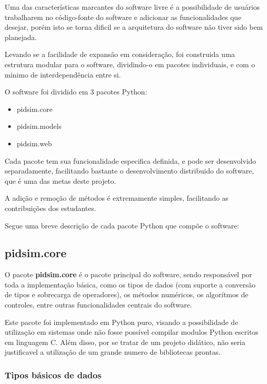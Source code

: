     Uma das características marcantes do software livre é a possibilidade de
    usuários trabalharem no código-fonte do software e adicionar as funcionalidades
    que desejar, porém isto se torna dificil se a arquitetura do software não tiver
    sido bem planejada.

    Levando se a facilidade de expansão em consideração, foi construida uma estrutura
    modular para o software, dividindo-o em pacotes individuais, e com o minimo de
    interdependência entre si.
    
    O software foi dividido em 3 pacotes Python:

    \begin{itemize}
        \item pidsim.core
        \item pidsim.models
        \item pidsim.web
    \end{itemize}

    Cada pacote tem sua funcionalidade especifica definida, e pode ser desenvolvido
    separadamente, facilitando bastante o desenvolvimento distribuido do software,
    que é uma das metas deste projeto.

    A adição e remoção de métodos é extremamente simples, facilitando as contribuições
    dos estudantes.

    Segue uma breve descrição de cada pacote Python que compõe o software:

    \subsection{pidsim.core}

        O pacote \textbf{pidsim.core} é o pacote principal do software, sendo responsável
        por toda a implementação básica, como os tipos de dados (com suporte a conversão
        de tipos e sobrecarga de operadores), os métodos numéricos, os algorítmos de controles,
        entre outras funcionalidades centrais do software.

        Este pacote foi implementado em Python puro, visando a possibilidade de utilização
        em sistemas onde não fosse possível compilar modulos Python escritos em linguagem C.
        Além disso, por se tratar de um projeto didático, não seria justificavel a utilização
        de um grande numero de bibliotecas prontas.

        \subsubsection{Tipos básicos de dados}

